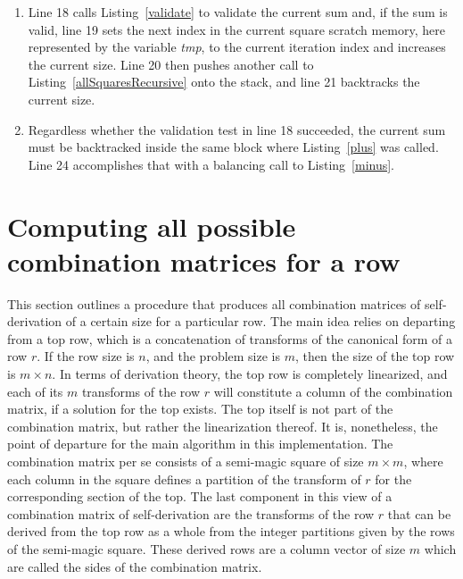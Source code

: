 \begin{enumerate}
\addtocounter{enumi}{3}
\item Line 18 calls Listing~\ref{validate} to validate the current sum and, if the sum is valid, line 19 sets the next index in the current square scratch memory, here represented by the variable \emph{tmp}, to the current iteration index and increases the current size. Line 20 then pushes another call to Listing~\ref{allSquaresRecursive} onto the stack, and line 21 backtracks the current size.
\addtocounter{enumi}{5}
\item Regardless whether the validation test in line 18 succeeded, the current sum must be backtracked inside the same block where Listing~\ref{plus} was called. Line 24 accomplishes that with a balancing call to Listing~\ref{minus}.
\end{enumerate}

\section{Computing all possible combination matrices for a row}

This section outlines a procedure that produces all combination matrices of self-derivation of a certain size for a particular row. The main idea relies on departing from a top row, which is a concatenation of transforms of the canonical form of a row $r$. If the row size is $n$, and the problem size is $m$, then the size of the top row is $m \times n$. In terms of derivation theory, the top row is completely linearized, and each of its $m$ transforms of the row $r$ will constitute a column of the combination matrix, if a solution for the top exists. The top itself is not part of the combination matrix, but rather the linearization thereof. It is, nonetheless, the point of departure for the main algorithm in this implementation. The combination matrix per se consists of a semi-magic square of size $m \times m$, where each column in the square defines a partition of the transform of $r$ for the corresponding section of the top. The last component in this view of a combination matrix of self-derivation are the transforms of the row $r$ that can be derived from the top row as a whole from the integer partitions given by the rows of the semi-magic square. These derived rows are a column vector of size $m$ which are called the sides of the combination matrix.

